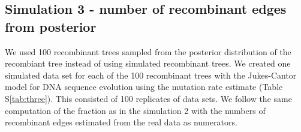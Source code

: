 \documentclass[10pt]{article}
\begin{document}
\subsection{Simulation 3 - number of recombinant edges from posterior}

We used 100 recombinant trees sampled from the posterior distribution
of the recombiant tree instead of using simulated recombinant trees.
We created one simulated data set for each of the 100 recombinant trees with
the Jukes-Cantor model for DNA sequence evolution 
using the mutation rate estimate (Table S\ref{tab:three}).
This consisted of 100 replicates of data sets.  
We follow the same computation of the fraction as in the simulation 2 with 
the numbers of recombinant edges estimated from the real data
as numerators. 

\end{document}
